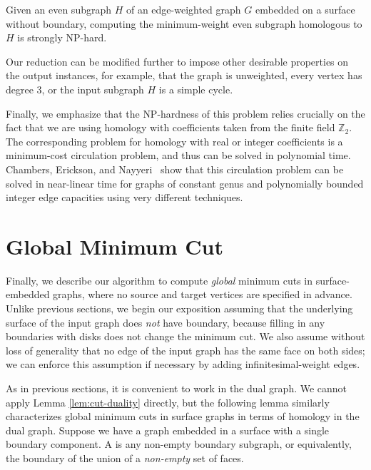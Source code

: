 \documentclass[letterpaper,review]{siamart190516}
\def\Z{\mathbb{Z}}
\begin{document}
{\begin{theorem}
Given an even subgraph $H$ of an edge-weighted graph $G$ embedded on a surface without boundary, computing the minimum-weight even subgraph homologous to $H$ is strongly {NP}-hard.
\end{theorem}
Our reduction can be modified further to impose other desirable properties on the output instances, for example, that the graph is unweighted, every vertex has degree $3$, or the input subgraph $H$ is a simple cycle.

Finally, we emphasize that the {NP}-hardness of this problem relies crucially on the fact that we are using homology with coefficients taken from the finite field $\Z_2$.  The corresponding problem for homology with real or integer coefficients is a minimum-cost circulation problem, and thus can be solved in polynomial time.
Chambers, Erickson, and Nayyeri~\cite{cen-hfcc-12} show that this circulation problem can be solved in near-linear time for graphs of constant genus and polynomially bounded integer edge capacities using very different techniques.


\def\minSS{X}

\section{Global Minimum Cut}
\label{sec:global}

Finally, we describe our algorithm to compute \emph{global} minimum cuts in surface-embedded graphs, where no source and target vertices are specified in advance.  
Unlike previous sections, we begin our exposition assuming that the underlying surface of the input
graph does \emph{not} have boundary, because filling in any boundaries with disks does not change
the minimum cut.
We also assume without loss of generality that no edge of the input graph has the same face on both
sides; we can enforce this assumption if necessary by adding infinitesimal-weight edges.

As in previous sections, it is convenient to work in the dual graph.  We cannot apply Lemma \ref{lem:cut-duality} directly, but the following lemma similarly characterizes global minimum cuts in surface graphs in terms of homology in the dual graph.
Suppose we have a graph embedded in a surface with a single boundary component.
A  is any non-empty boundary subgraph, or equivalently, the boundary of the union of a \emph{non-empty} set of faces.

}
\end{document}
